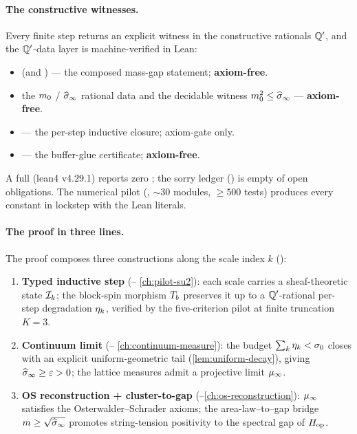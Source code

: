 \paragraph*{The constructive witnesses.}  Every finite step returns an
explicit witness in the constructive rationals $\mathbb{Q}'$, and the
$\mathbb{Q}'$-data layer is machine-verified in Lean:
\begin{itemize}\setlength{\itemsep}{1pt}
  \item {} (and
    ) --- the composed mass-gap statement;
    \textbf{axiom-free}.
  \item the $m_0$ / $\widehat{\sigma}_\infty$ rational data and the decidable
    witness $m_0^2 \le \widehat{\sigma}_\infty$ --- \textbf{axiom-free}.
  \item {} --- the per-step
    inductive closure; axiom-gate \codepath{[propext]} only.
  \item {} --- the buffer-glue
    certificate; \textbf{axiom-free}.
\end{itemize}
A full  (lean4 v4.29.1) reports zero
; the sorry ledger ()
is empty of open obligations.  The numerical pilot
(, ${\sim}30$ modules, $\ge 500$ tests)
produces every constant in lockstep with the Lean literals.

\paragraph*{The proof in three lines.}  The proof composes three
constructions along the scale index $k$ ():
\begin{enumerate}\setlength{\itemsep}{1pt}
  \item \textbf{Typed inductive step} (--%
    \ref{ch:pilot-su2}): each scale carries a sheaf-theoretic state
    $\mathcal{I}_k$; the block-spin morphism $T_b$ preserves it up to a
    $\mathbb{Q}'$-rational per-step degradation $\eta_k$, verified by the
    five-criterion pilot at finite truncation $K = 3$.
  \item \textbf{Continuum limit} (--%
    \ref{ch:continuum-measure}): the budget $\sum_k \eta_k < \sigma_0$
    closes with an explicit uniform-geometric tail
    (\cref{lem:uniform-decay}), giving $\widehat{\sigma}_\infty \ge \varepsilon > 0$;
    the lattice measures admit a projective limit $\mu_\infty$.
  \item \textbf{OS reconstruction + cluster-to-gap}
    (--\ref{ch:os-reconstruction}): $\mu_\infty$
    satisfies the Osterwalder--Schrader axioms; the area-law--to--gap
    bridge $m \ge \sqrt{\widehat{\sigma}_\infty}$ promotes string-tension positivity
    to the spectral gap of $H_{\mathrm{op}}$.
\end{enumerate}

